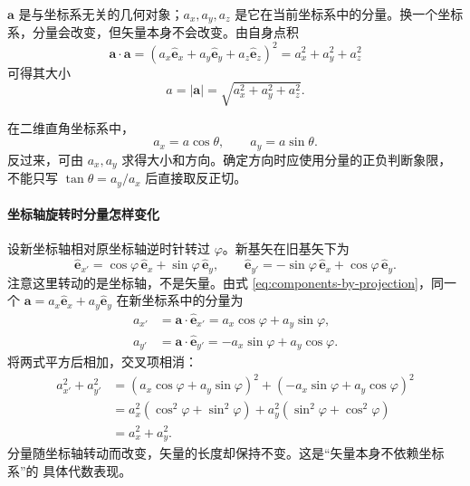 \documentclass[UTF8,zihao=-4,oneside,openany]{ctexbook}
\numberwithin{equation}{section}
\newcommand{\vect}[1]{\bm{#1}}
\newcommand{\uvec}[1]{\hat{\vect{#1}}}
\begin{document}
$\vect a$ 是与坐标系无关的几何对象；$a_x,a_y,a_z$ 是它在当前坐标系中的分量。换一个坐标系，分量会改变，但矢量本身不会改变。由自身点积
\[
  \vect a\cdot\vect a
  =(a_x\uvec e_x+a_y\uvec e_y+a_z\uvec e_z)^2
  =a_x^2+a_y^2+a_z^2
\]
可得其大小
\begin{equation}
  a=\lvert\vect a\rvert=\sqrt{a_x^2+a_y^2+a_z^2}.
  \label{eq:vector-magnitude}
\end{equation}

\begin{center}
\end{center}

在二维直角坐标系中，
\[
  a_x=a\cos\theta,\qquad a_y=a\sin\theta.
\]
反过来，可由 $a_x,a_y$ 求得大小和方向。确定方向时应使用分量的正负判断象限，不能只写 $\tan\theta=a_y/a_x$ 后直接取反正切。

\paragraph{坐标轴旋转时分量怎样变化}
设新坐标轴相对原坐标轴逆时针转过 $\varphi$。新基矢在旧基矢下为
\begin{equation}
  \uvec e_{x'}=\cos\varphi\,\uvec e_x+\sin\varphi\,\uvec e_y,
  \qquad
  \uvec e_{y'}=-\sin\varphi\,\uvec e_x+\cos\varphi\,\uvec e_y.
  \label{eq:rotated-basis}
\end{equation}
注意这里转动的是坐标轴，不是矢量。由式 \eqref{eq:components-by-projection}，同一个
$\vect a=a_x\uvec e_x+a_y\uvec e_y$ 在新坐标系中的分量为
\begin{align}
  a_{x'}&=\vect a\cdot\uvec e_{x'}
  =a_x\cos\varphi+a_y\sin\varphi,\label{eq:rotation-x}\\
  a_{y'}&=\vect a\cdot\uvec e_{y'}
  =-a_x\sin\varphi+a_y\cos\varphi.\label{eq:rotation-y}
\end{align}
将两式平方后相加，交叉项相消：
\begin{align*}
  a_{x'}^2+a_{y'}^2
  &=(a_x\cos\varphi+a_y\sin\varphi)^2
    +(-a_x\sin\varphi+a_y\cos\varphi)^2\\
  &=a_x^2(\cos^2\varphi+\sin^2\varphi)
    +a_y^2(\sin^2\varphi+\cos^2\varphi)\\
  &=a_x^2+a_y^2.
\end{align*}
分量随坐标轴转动而改变，矢量的长度却保持不变。这是“矢量本身不依赖坐标系”的
具体代数表现。
\end{document}
